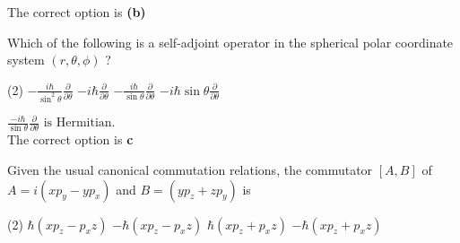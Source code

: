\begin{enumerate}
\begin{answer}
The correct option is \textbf{(b)}	
\end{answer}
\begin{minipage}{\textwidth}
	\item Which of the following is a self-adjoint operator in the spherical polar coordinate system $(r, \theta, \phi)$ ?
\end{minipage}
\begin{tasks}(2)
	\task[\textbf{A.}] $-\frac{i \hbar}{\sin ^{2} \theta} \frac{\partial}{\partial \theta}$
	\task[\textbf{B.}]$-i \hbar \frac{\partial}{\partial \theta}$
	\task[\textbf{C.}] $-\frac{i \hbar}{\sin \theta} \frac{\partial}{\partial \theta}$
	\task[\textbf{D.}] $-i \hbar \sin \theta \frac{\partial}{\partial \theta}$
\end{tasks}
\begin{answer}
	$\frac{-i \hbar}{\sin \theta} \frac{\partial}{\partial \theta} \text { is Hermitian. }$\\
	The correct option is \textbf{c}
\end{answer}
\begin{minipage}{\textwidth}
	\item Given the usual canonical commutation relations, the commutator $[A, B]$ of $A=i\left(x p_{y}-y p_{x}\right)$ and $B=\left(y p_{z}+z p_{y}\right)$ is
\end{minipage}
\begin{tasks}(2)
	\task[\textbf{A.}] $\hbar\left(x p_{z}-p_{x} z\right)$
	\task[\textbf{B.}]$-\hbar\left(x p_{z}-p_{x} z\right)$
	\task[\textbf{C.}]$\hbar\left(x p_{z}+p_{x} z\right)$
	\task[\textbf{D.}]$-\hbar\left(x p_{z}+p_{x} z\right)$
\end{tasks}
\begin{answer}


\end{answer}
\end{enumerate}
